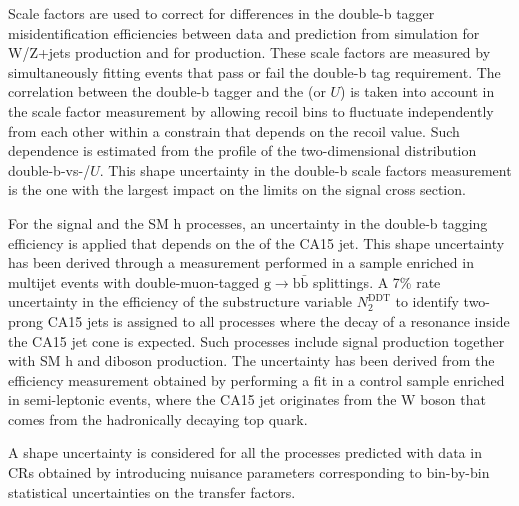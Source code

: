 Scale factors are used to correct for differences in the double-b tagger misidentification efficiencies between data and prediction from simulation for W/Z+jets production and for \ttbar production. These scale factors are measured by simultaneously fitting events that pass or fail the double-b tag requirement. The correlation between the double-b tagger and the \ptmiss (or $U$) is taken into account in the scale factor measurement by allowing recoil bins to fluctuate independently from each other within a constrain that depends on the recoil value. Such dependence is estimated from the profile of the two-dimensional distribution double-b-vs-\ptmiss/$U$. This shape uncertainty in the double-b scale factors measurement is the one with the largest impact on the limits on the signal cross section.

For the signal and the SM h processes, an uncertainty in the double-b tagging efficiency is applied that depends on the \pt of the CA15 jet. This shape uncertainty has been derived through a measurement performed in a sample enriched in multijet events with double-muon-tagged $\text{g}\to\text{b}\bar{\text{b}}$ splittings. A 7\% rate uncertainty in the efficiency of the substructure variable $N_2^\text{DDT}$ to identify two-prong CA15 jets is assigned to all processes where the decay of a resonance inside the CA15 jet cone is expected. Such processes include signal production together with SM h and diboson production. The uncertainty has been derived from the efficiency measurement obtained by performing a fit in a control sample enriched in semi-leptonic \ttbar events, where the CA15 jet originates from the W boson that comes from the hadronically decaying top quark. 


A shape uncertainty is considered for all the processes predicted with data in CRs obtained by introducing nuisance parameters corresponding to bin-by-bin statistical uncertainties on the transfer factors.

